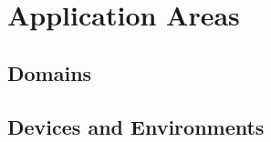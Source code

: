 \section{Application Areas}
\label{applicationareas}

\subsection{Domains}
\label{domains}

\subsection{Devices and Environments}
\label{devices}
